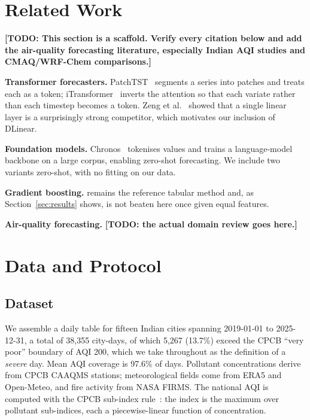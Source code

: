 \documentclass[conference]{IEEEtran}
\newcommand{\todo}[1]{\textbf{[TODO: #1]}}
\begin{document}
\section{Related Work}

\todo{This section is a scaffold. Verify every citation below and add the air-quality
forecasting literature, especially Indian AQI studies and CMAQ/WRF-Chem comparisons.}

\textbf{Transformer forecasters.} PatchTST~\cite{nie2023patchtst} segments a series into
patches and treats each as a token; iTransformer~\cite{liu2024itransformer} inverts the
attention so that each variate rather than each timestep becomes a token.
Zeng et al.~\cite{zeng2023dlinear} showed that a single linear layer is a surprisingly
strong competitor, which motivates our inclusion of DLinear.

\textbf{Foundation models.} Chronos~\cite{ansari2024chronos} tokenises values and trains a
language-model backbone on a large corpus, enabling zero-shot forecasting. We include
two variants zero-shot, with no fitting on our data.

\textbf{Gradient boosting.} \cite{ke2017lightgbm} remains the reference tabular method and,
as Section~\ref{sec:results} shows, is not beaten here once given equal features.

\textbf{Air-quality forecasting.} \todo{the actual domain review goes here.}

\section{Data and Protocol}
\label{sec:data}

\subsection{Dataset}

We assemble a daily table for fifteen Indian cities spanning 2019-01-01 to 2025-12-31,
a total of 38{,}355 city-days, of which 5{,}267 (13.7\%) exceed the CPCB ``very poor''
boundary of AQI 200, which we take throughout as the definition of a \emph{severe} day.
Mean AQI coverage is 97.6\% of days. Pollutant concentrations derive from CPCB CAAQMS
stations; meteorological fields come from ERA5 and Open-Meteo, and fire activity from
NASA FIRMS. The national AQI is computed with the CPCB
sub-index rule~\cite{cpcb2014naqi}: the index is the maximum over pollutant sub-indices,
each a piecewise-linear function of concentration.
\end{document}
